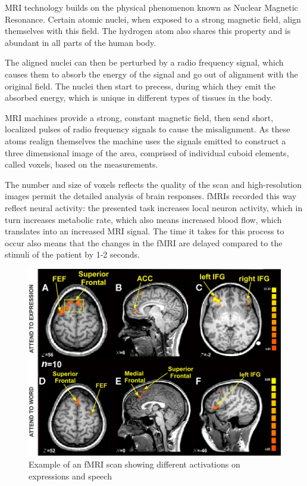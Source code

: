 		MRI technology builds on the physical phenomenon known as Nuclear Magnetic Resonance. Certain atomic nuclei, when exposed to a strong magnetic field, align themselves with this field. The hydrogen atom also shares this property and is abundant in all parts of the human body. 
		
		The aligned nuclei can then be perturbed by a radio frequency signal, which causes them to absorb the energy of the signal and go out of alignment with the original field. The nuclei then start to precess, during which they emit the absorbed energy, which is unique in different types of tissues in the body\cite{plewes2012physics}.
		
		MRI machines provide a strong, constant magnetic field, then send short, localized pulses of radio frequency signals to cause the misalignment. As these atoms realign themselves the machine uses the signals emitted to construct a three dimensional image of the area, comprised of individual cuboid elements, called voxels, based on the measurements.
		
		
		The number and size of voxels reflects the quality of the scan and high-resolution images permit the detailed analysis of brain responses. fMRIs recorded this way reflect neural activity: the presented task increases local neuron activity, which in turn increases metabolic rate, which also means increased blood flow, which translates into an increased MRI signal. The time it takes for this process to occur also means that the changes in the fMRI are delayed compared to the stimuli of the patient by 1-2 seconds\cite{deyoe1994functional}.
		
		\begin{figure}[!h]
			\centering
			\includegraphics[width=\textwidth]{figures/fmri_example.jpg}
			\caption{Example of an fMRI scan showing different activations on expressions and speech\cite{ovaysikia2011word}}
		\end{figure}
		
